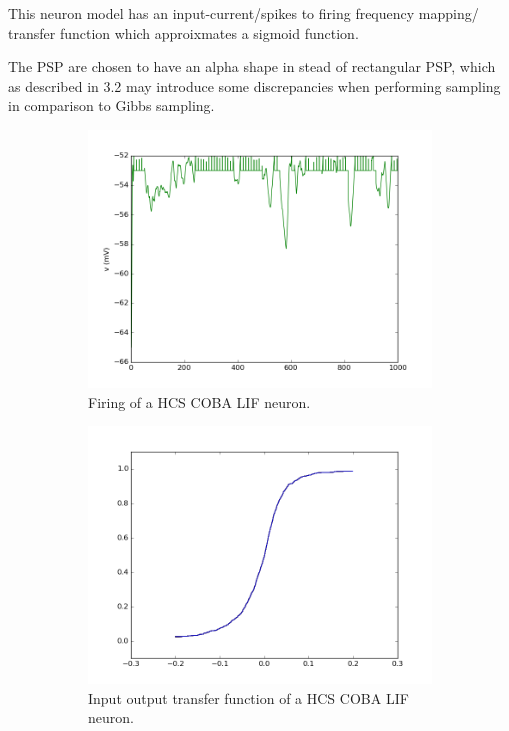 This neuron model has an input-current/spikes to firing frequency mapping/ transfer function which approixmates a sigmoid function.


The PSP are chosen to have an alpha shape in stead of rectangular PSP, which as described in 3.2 may introduce some discrepancies when performing sampling in comparison to Gibbs sampling.

\begin{figure}
	\centering
	\begin{subfigure}[t]{.5\textwidth}
  		\centering
  		\includegraphics[width=.8\linewidth]{imgs/coba_lif_act.png}
  		\caption{Firing of a HCS COBA LIF neuron.}
  		\label{fig:sub1}
	\end{subfigure}%
	\begin{subfigure}[t]{.5\textwidth}
  		\centering
  		\includegraphics[width=.8\linewidth]{imgs/coba_lif_sigmoid.png}
  		\caption{Input output transfer function of a HCS COBA LIF neuron.}
  		\label{fig:sub2}
	\end{subfigure}
	\begin{subfigure}[t]{.5\textwidth}

\end{subfigure}
\end{figure}
